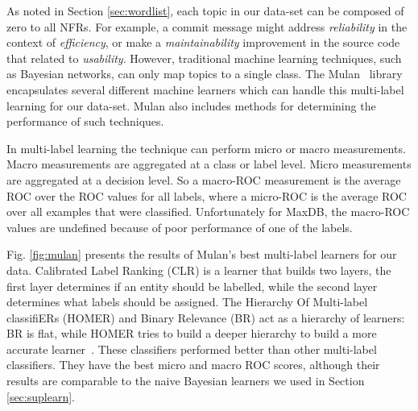 \documentclass[]{sig-alternate}
\begin{document}
As noted in Section \ref{sec:wordlist}, each topic in our data-set can be composed of zero to all NFRs. For example, a commit message might address \textit{reliability} in the context of \textit{efficiency}, or make a \textit{maintainability} improvement in the source code that related to \textit{usability}. However, traditional machine learning techniques, such as Bayesian networks, can only map topics to a single class. The Mulan~\cite{mulan} library encapsulates several different machine learners which can handle this multi-label learning for our data-set. Mulan also includes methods for determining the performance of such techniques.

In multi-label learning the technique can perform micro or macro measurements. Macro measurements are aggregated at a class or label level. Micro measurements are aggregated at a decision level. 
 So a macro-ROC measurement is the average ROC over the ROC values for all labels, where a micro-ROC is the average ROC over all examples that were classified. Unfortunately for MaxDB, the macro-ROC values are undefined because of poor performance of one of the labels.

Fig. \ref{fig:mulan} presents the results of Mulan's best multi-label
learners for our data. Calibrated Label Ranking (CLR) is a learner
that builds two layers, the first layer determines if an entity should
be labelled, while the second layer determines what labels should be assigned.
The Hierarchy Of Multi-label classifiERs (HOMER) and Binary Relevance (BR) act as a hierarchy of learners: BR is flat, while HOMER tries to build a deeper hierarchy to build a more accurate learner~\cite{mulan}. These classifiers performed better than other multi-label classifiers. They have the best micro and macro ROC scores, although their results are comparable to the naive Bayesian learners we used in Section \ref{sec:suplearn}.
\end{document}
